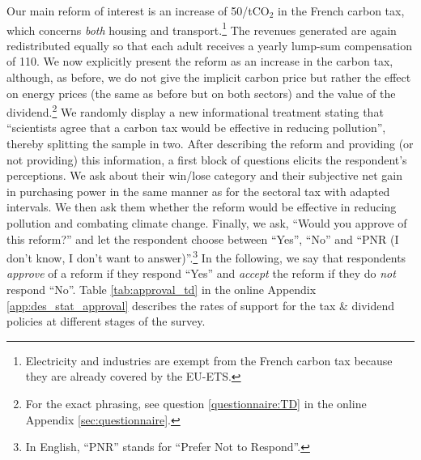 \documentclass[12pt]{article} %
\begin{document}
Our main reform of interest is an increase of 50\euros{}/t$\text{CO}_{2}$ in the French carbon tax, which concerns \textit{both} housing and transport.\footnote{Electricity and industries are exempt from the French carbon tax because they are already covered by the EU-ETS.} The revenues generated are again redistributed equally so that each adult receives a yearly lump-sum compensation of 110\euros{}. We now explicitly present the reform as an increase in the carbon tax, although, as before, we do not give the implicit carbon price but rather the effect on energy prices (the same as before but on both sectors) and the value of the dividend.\footnote{For the exact phrasing, see question \ref{questionnaire:TD} in the online Appendix \ref{sec:questionnaire}.} We randomly display a new informational treatment stating that ``scientists agree that a carbon tax would be effective in reducing pollution'', thereby splitting the sample in two. After describing the reform and providing (or not providing) this information, a first block of questions elicits the respondent's perceptions. We ask about their win/lose category and their subjective net gain in purchasing power in the same manner as for the sectoral tax with adapted intervals. We then ask them whether the reform would be effective in reducing pollution and combating climate change. Finally, we ask, ``Would you approve of this reform?'' and let the respondent choose between ``Yes'', ``No'' and ``PNR (I don't know, I don't want to answer)''.\footnote{In English, ``PNR'' stands for ``Prefer Not to Respond''.} In the following, we say that respondents \emph{approve} of a reform if they respond ``Yes'' and \emph{accept} the reform if they do \emph{not} respond ``No''. Table \ref{tab:approval_td} in the online Appendix \ref{app:des_stat_approval} describes the rates of support for the tax \& dividend policies at different stages of the survey.
\end{document}
